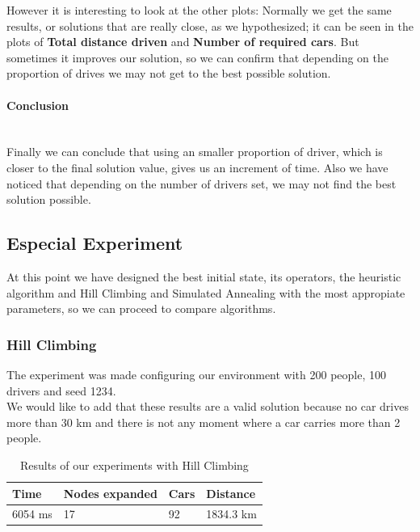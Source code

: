 \documentclass[12]{article}
\begin{document}
 However it is interesting to look at the other plots:
Normally we get the same results, or solutions that are really close, as we hypothesized; it can be seen in the plots of \textbf{Total distance driven} and \textbf{Number of required cars}. But sometimes it improves our solution, so we can confirm that depending on the proportion of drives we may not get to the best possible solution. 
    

\paragraph{Conclusion}\mbox{}\\

Finally we can conclude that using an smaller proportion of driver, which is closer to the final solution value, gives us an increment of time. Also we have noticed that depending on the number of drivers set, we may not find the best solution possible. 

\subsection{Especial Experiment}

At this point we have designed the best initial state, its operators, the heuristic algorithm and Hill Climbing and Simulated Annealing with the most appropiate parameters, so we can proceed to compare algorithms. 


\subsubsection{Hill Climbing}

The experiment was made configuring our environment with 200 people, 100 drivers and seed 1234.
\\

We would like to add that these results are a valid solution because no car drives more than 30 km and there is not any moment where a car carries more than 2 people. 
\\

\begin{table}[h]
\centering
\begin{tabular}{|l|l|l|l|}
\hline \textbf{Time} &
 \textbf{Nodes expanded} & \textbf{Cars} & \textbf{Distance}\\  \hline
6054 ms &  17 & 92 & 1834.3 km \\ \hline
\end{tabular}
\caption{Results of our experiments with Hill Climbing}
\label{Results}
\end{table}
\end{document}
